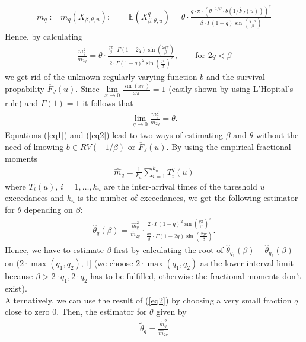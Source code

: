 \documentclass[10pt, a4paper]{article}\usepackage[]{graphicx}\usepackage[]{color}
\newcommand{\widebar}{\overline}
\begin{document}
\begin{align} 
m_q:=m_q(X_{\beta,\theta,u}):&=\mathbb{E}(X_{\beta,\theta,u}^q) = \theta \cdot \frac{ q \cdot \pi \cdot (\theta^{-1/\beta}\cdot b(1/\widebar{F}_J(u)))^q }{\beta \cdot \Gamma(1-q)\sin(\frac{q \cdot \pi}{\beta})} 
\end{align}
Hence, by calculating
\begin{align} \label{eq1}
	\frac{m_q^2}{m_{2q}}=
	\theta \cdot \frac{\frac{q\pi}{\beta}\cdot\Gamma(1-2q)\sin(\frac{2q\pi}{\beta})}{2\cdot\Gamma(1-q)^2\sin(\frac{q\pi}{\beta})^2}, \qquad \text{for \ } 2q<\beta
\end{align}
we get rid of the unknown regularly varying function $b$ and the survival propability $\widebar{F}_J(u)$.
Since $\lim\limits_{x \to 0}\frac{\sin(x\pi)}{x\pi} = 1$ (easily shown by using L'Hopital's rule) and $\Gamma(1)=1$ it follows that
\begin{align} \label{eq2}
\lim\limits_{q \to 0} \frac{m_q^2}{m_{2q}} = \theta.
\end{align}
Equations (\ref{eq1}) and (\ref{eq2}) lead to two ways of estimating $\beta$ and $\theta$ without the need of knowing $b \in RV(-1/\beta)$ or $\widebar{F}_J(u)$.
By using the empirical fractional moments
\begin{align}
	\widehat{m}_q=\frac{1}{k_u}\sum_{i=1}^{k_u} T_i^q(u)
\end{align}
where $T_i(u)$, $i=1,\dots,k_u$ are the inter-arrival times of the threshold $u$ exceedances and $k_u$ is the number of exceedances, we get the following estimator for $\theta$ depending on $\beta$:
\begin{align} \label{eq3}
	\widehat{\theta}_q(\beta)=\frac{\widehat{m}_q^2}{\widehat{m}_{2q}}\cdot \frac{2\cdot\Gamma(1-q)^2\sin(\frac{q\pi}{\beta})^2}{\frac{q\pi}{\beta}\cdot\Gamma(1-2q)\sin(\frac{2q\pi}{\beta})}.
\end{align}
Hence, we have to estimate $\beta$ first by calculating the root of $\widehat{\theta}_{q_1}(\beta)-\widehat{\theta}_{q_2}(\beta)$ on $(2\cdot\max(q_1,q_2),1]$ (we choose $2\cdot\max(q_1,q_2)$ as the lower interval limit because $\beta>2\cdot q_1,2\cdot q_2$ has to be fulfilled, otherwise the fractional moments don't exist). 
\\
Alternatively, we can use the result of (\ref{eq2}) by choosing a very small fraction $q$ close to zero $0$. Then, the estimator for $\theta$ given by
\begin{align}
\widetilde{\theta}_q=\frac{\widehat{m}_q^2}{\widehat{m}_{2q}}
\end{align}
\end{document}
